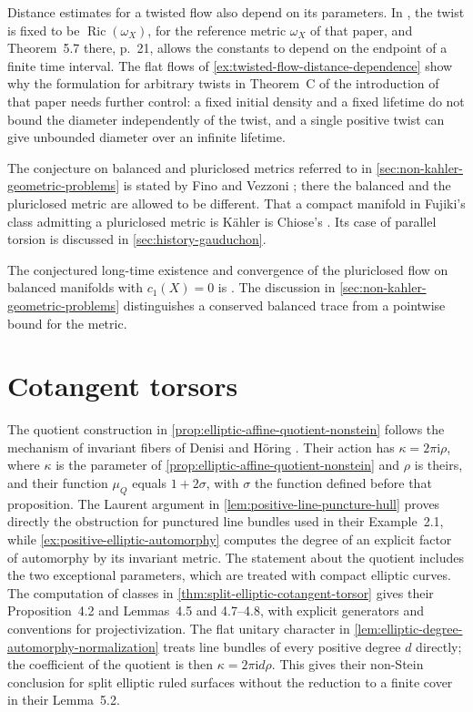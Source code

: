 Distance estimates for a twisted flow also depend on its parameters. In \cite[v2, Section~5.2, p.~18]{Dang26}, the twist is fixed to be $\operatorname{Ric}(\omega_X)$, for the reference metric $\omega_X$ of that paper, and Theorem~5.7 there, p.~21, allows the constants to depend on the endpoint of a finite time interval. The flat flows of \cref{ex:twisted-flow-distance-dependence} show why the formulation for arbitrary twists in Theorem~C of the introduction of that paper needs further control: a fixed initial density and a fixed lifetime do not bound the diameter independently of the twist, and a single positive twist can give unbounded diameter over an infinite lifetime.

The conjecture on balanced and pluriclosed metrics referred to in \cref{sec:non-kahler-geometric-problems} is stated by Fino and Vezzoni \cite[Conjecture 1.1]{FV26}; there the balanced and the pluriclosed metric are allowed to be different. That a compact manifold in Fujiki's class admitting a pluriclosed metric is K\"ahler is Chiose's \cite[Theorem~0.2, p.~3561]{Chiose14}. Its case of parallel torsion is discussed in \cref{sec:history-gauduchon}.

The conjectured long-time existence and convergence of the pluriclosed flow on balanced manifolds with $c_1(X)=0$ is \cite[Conjecture 1.2]{FV26}. The discussion in \cref{sec:non-kahler-geometric-problems} distinguishes a conserved balanced trace from a pointwise bound for the metric.

\section{Cotangent torsors}
\label{sec:history-cotangent-torsors}

The quotient construction in \cref{prop:elliptic-affine-quotient-nonstein} follows the mechanism of invariant fibers of Denisi and H\"oring \cite[v1, Lemma~2.10, p.~6, Proposition~4.2, p.~12 and pp.~14--18, and Theorem~5.1, p.~19]{DH26}. Their action has $\kappa=2\pi\mathrm{i}\rho$, where $\kappa$ is the parameter of \cref{prop:elliptic-affine-quotient-nonstein} and $\rho$ is theirs, and their function $\mu_Q$ equals $1+2\sigma$, with $\sigma$ the function defined before that proposition. The Laurent argument in \cref{lem:positive-line-puncture-hull} proves directly the obstruction for punctured line bundles used in their Example~2.1, while \cref{ex:positive-elliptic-automorphy} computes the degree of an explicit factor of automorphy by its invariant metric. The statement about the quotient includes the two exceptional parameters, which are treated with compact elliptic curves. The computation of classes in \cref{thm:split-elliptic-cotangent-torsor} gives their Proposition~4.2 and Lemmas~4.5 and 4.7--4.8, with explicit generators and conventions for projectivization. The flat unitary character in \cref{lem:elliptic-degree-automorphy-normalization} treats line bundles of every positive degree $d$ directly; the coefficient of the quotient is then $\kappa=2\pi\mathrm{i}d\rho$. This gives their non-Stein conclusion for split elliptic ruled surfaces without the reduction to a finite cover in their Lemma~5.2.

